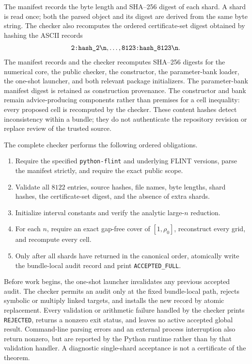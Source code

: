\documentclass[11pt,a4paper,twoside]{article}
\theoremstyle{remark}
\newcommand{\rhozero}{\rho_{0}}
\newcommand{\code}[1]{\texttt{#1}}
\begin{document}
The manifest records the byte length and SHA--256 digest of each shard.  A
shard is read once; both the parsed object and its digest are derived from the
same byte string.  The checker also recomputes the ordered certificate-set
digest obtained by hashing the ASCII records
\[
 \code{2:hash\_2\string\n},\ldots,
 \code{8123:hash\_8123\string\n}.
\]
The manifest records and the checker recomputes SHA--256 digests for the
numerical core, the public checker, the constructor, the parameter-bank
loader, the one-shot launcher, and both relevant package initializers.  The
parameter-bank manifest digest is retained as construction provenance.  The
constructor and bank remain advice-producing components rather than premises
for a cell inequality: every proposed cell is recomputed by the checker.
These content hashes detect inconsistency within a bundle; they do not
authenticate the repository revision or replace review of the trusted source.

The complete checker performs the following ordered obligations.

\begin{enumerate}[leftmargin=2.2em]
\item Require the specified \code{python-flint} and underlying FLINT versions,
parse the manifest strictly, and require the exact public scope.
\item Validate all \(8122\) entries, source hashes, file names, byte lengths,
shard hashes, the certificate-set digest, and the absence of extra shards.
\item Initialize interval constants and verify the analytic large-\(n\)
reduction.
\item For each \(n\), require an exact gap-free cover of
\([1,\rhozero]\), reconstruct every grid, and recompute every cell.
\item Only after all shards have returned in the canonical order, atomically
write the bundle-local audit record and print \code{ACCEPTED\_FULL}.
\end{enumerate}

Before work begins, the one-shot launcher invalidates any previous accepted
audit.  The checker permits an audit only at the fixed bundle-local path,
rejects symbolic or multiply linked targets, and installs the new record by
atomic replacement.  Every validation or arithmetic failure handled by the
checker prints \code{REJECTED}, returns a nonzero exit status, and leaves no
active accepted global result.  Command-line parsing errors and an external
process interruption also return nonzero, but are reported by the Python
runtime rather than by that validation handler.  A diagnostic
single-shard acceptance is not a certificate of the theorem.
\end{document}
